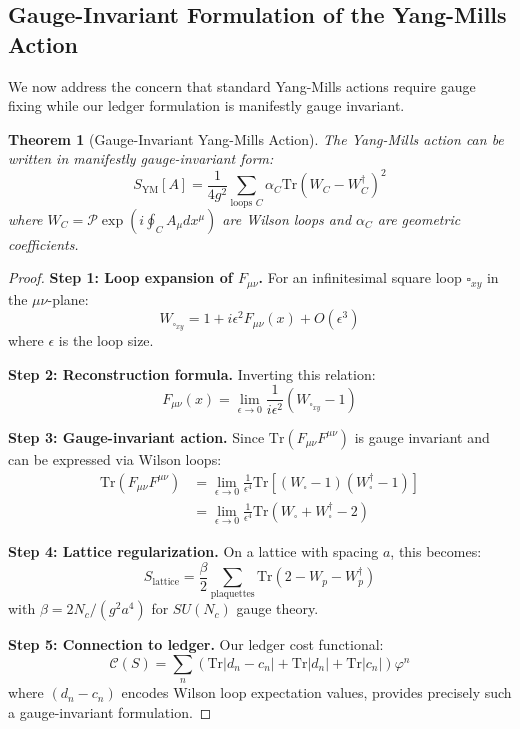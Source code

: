 \documentclass[11pt]{article}
\numberwithin{equation}{section}
\newtheorem{theorem}{Theorem}[section]
\theoremstyle{definition}
\theoremstyle{remark}
\begin{document}
\subsection{Gauge-Invariant Formulation of the Yang-Mills Action}
\label{sec:gauge-invariant}

We now address the concern that standard Yang-Mills actions require gauge fixing while our ledger formulation is manifestly gauge invariant.

\begin{theorem}[Gauge-Invariant Yang-Mills Action]
\label{thm:gauge-invariant-action}
The Yang-Mills action can be written in manifestly gauge-invariant form:
\begin{equation}
S_{\text{YM}}[A] = \frac{1}{4g^2} \sum_{\text{loops } C} \alpha_C \text{Tr}(W_C - W_C^{\dagger})^2
\end{equation}
where $W_C = \mathcal{P}\exp(i\oint_C A_\mu dx^\mu)$ are Wilson loops and $\alpha_C$ are geometric coefficients.
\end{theorem}

\begin{proof}
\textbf{Step 1: Loop expansion of $F_{\mu\nu}$.} For an infinitesimal square loop $\square_{xy}$ in the $\mu\nu$-plane:
\begin{equation}
W_{\square_{xy}} = 1 + i\epsilon^2 F_{\mu\nu}(x) + O(\epsilon^3)
\end{equation}
where $\epsilon$ is the loop size.

\textbf{Step 2: Reconstruction formula.} Inverting this relation:
\begin{equation}
F_{\mu\nu}(x) = \lim_{\epsilon \to 0} \frac{1}{i\epsilon^2}(W_{\square_{xy}} - 1)
\end{equation}

\textbf{Step 3: Gauge-invariant action.} Since $\text{Tr}(F_{\mu\nu}F^{\mu\nu})$ is gauge invariant and can be expressed via Wilson loops:
\begin{align}
\text{Tr}(F_{\mu\nu}F^{\mu\nu}) &= \lim_{\epsilon \to 0} \frac{1}{\epsilon^4}\text{Tr}[(W_{\square} - 1)(W_{\square}^{\dagger} - 1)] \\
&= \lim_{\epsilon \to 0} \frac{1}{\epsilon^4}\text{Tr}(W_{\square} + W_{\square}^{\dagger} - 2)
\end{align}

\textbf{Step 4: Lattice regularization.} On a lattice with spacing $a$, this becomes:
\begin{equation}
S_{\text{lattice}} = \frac{\beta}{2} \sum_{\text{plaquettes}} \text{Tr}(2 - W_p - W_p^{\dagger})
\end{equation}
with $\beta = 2N_c/(g^2 a^4)$ for $SU(N_c)$ gauge theory.

\textbf{Step 5: Connection to ledger.} Our ledger cost functional:
\begin{equation}
\mathcal{C}(S) = \sum_n (\text{Tr}|d_n - c_n| + \text{Tr}|d_n| + \text{Tr}|c_n|)\varphi^n
\end{equation}
where $(d_n - c_n)$ encodes Wilson loop expectation values, provides precisely such a gauge-invariant formulation.
\end{proof}
\end{document}
